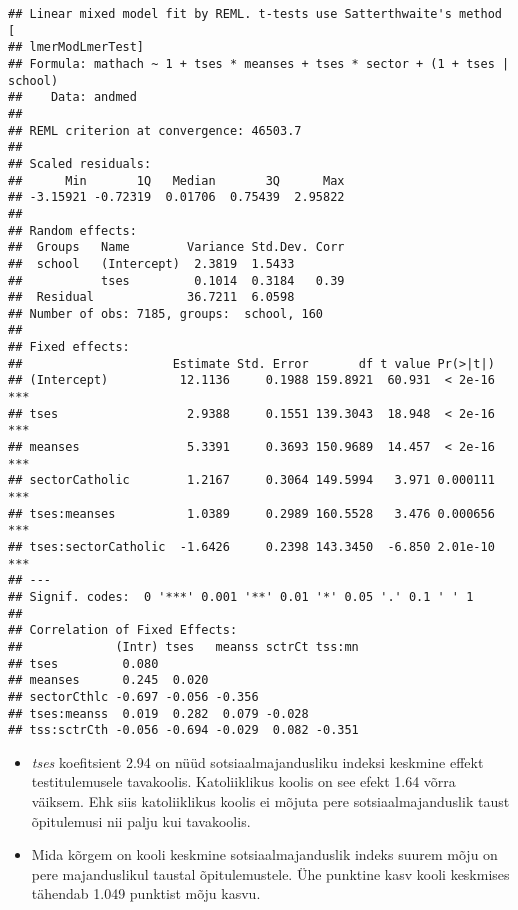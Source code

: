 \documentclass[
]{book}
\providecommand{\tightlist}{%
  \setlength{\itemsep}{0pt}\setlength{\parskip}{0pt}}
\begin{document}
\begin{verbatim}
## Linear mixed model fit by REML. t-tests use Satterthwaite's method [
## lmerModLmerTest]
## Formula: mathach ~ 1 + tses * meanses + tses * sector + (1 + tses | school)
##    Data: andmed
## 
## REML criterion at convergence: 46503.7
## 
## Scaled residuals: 
##      Min       1Q   Median       3Q      Max 
## -3.15921 -0.72319  0.01706  0.75439  2.95822 
## 
## Random effects:
##  Groups   Name        Variance Std.Dev. Corr
##  school   (Intercept)  2.3819  1.5433       
##           tses         0.1014  0.3184   0.39
##  Residual             36.7211  6.0598       
## Number of obs: 7185, groups:  school, 160
## 
## Fixed effects:
##                     Estimate Std. Error       df t value Pr(>|t|)    
## (Intercept)          12.1136     0.1988 159.8921  60.931  < 2e-16 ***
## tses                  2.9388     0.1551 139.3043  18.948  < 2e-16 ***
## meanses               5.3391     0.3693 150.9689  14.457  < 2e-16 ***
## sectorCatholic        1.2167     0.3064 149.5994   3.971 0.000111 ***
## tses:meanses          1.0389     0.2989 160.5528   3.476 0.000656 ***
## tses:sectorCatholic  -1.6426     0.2398 143.3450  -6.850 2.01e-10 ***
## ---
## Signif. codes:  0 '***' 0.001 '**' 0.01 '*' 0.05 '.' 0.1 ' ' 1
## 
## Correlation of Fixed Effects:
##             (Intr) tses   meanss sctrCt tss:mn
## tses         0.080                            
## meanses      0.245  0.020                     
## sectorCthlc -0.697 -0.056 -0.356              
## tses:meanss  0.019  0.282  0.079 -0.028       
## tss:sctrCth -0.056 -0.694 -0.029  0.082 -0.351
\end{verbatim}

\begin{itemize}
\tightlist
\item
  \emph{tses} koefitsient 2.94 on nüüd sotsiaalmajandusliku indeksi keskmine effekt testitulemusele tavakoolis. Katoliiklikus koolis on see efekt 1.64 võrra väiksem. Ehk siis katoliiklikus koolis ei mõjuta pere sotsiaalmajanduslik taust õpitulemusi nii palju kui tavakoolis.\\
\item
  Mida kõrgem on kooli keskmine sotsiaalmajanduslik indeks suurem mõju on pere majanduslikul taustal õpitulemustele. Ühe punktine kasv kooli keskmises tähendab 1.049 punktist mõju kasvu.
\end{itemize}

  
\end{document}
